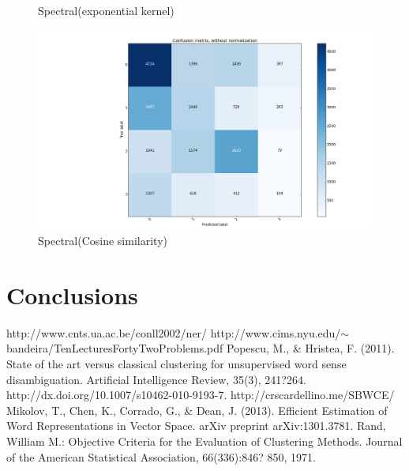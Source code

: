 \documentclass[]{article}
\begin{document}
\begin{figure}
\begin{minipage}[b]{0.5\linewidth}
    \caption{Spectral(exponential kernel)} 
    \vspace{4ex}
  \end{minipage}%
  \begin{minipage}[b]{0.5\linewidth}
    \centering
    \includegraphics[width=1\linewidth]{cosSimConfMat2.png} 
    \caption{Spectral(Cosine similarity)} 
    \vspace{4ex}
  \end{minipage} 
\end{figure}


\section{Conclusions}
  
\pagestyle{myheadings}
\thispagestyle{plain}


\begin{thebibliography}{1}
   http://www.cnts.ua.ac.be/conll2002/ner/
  http://www.cims.nyu.edu/$\sim$bandeira/TenLecturesFortyTwoProblems.pdf
   Popescu, M., \& Hristea, F. (2011). State of the art versus classical clustering for unsupervised word sense disambiguation. Artificial Intelligence Review, 35(3), 241?264. http://dx.doi.org/10.1007/s10462-010-9193-7.  
   http://crscardellino.me/SBWCE/
    Mikolov, T., Chen, K., Corrado, G., \& Dean, J. (2013). Efficient Estimation of Word Representations in Vector Space. arXiv preprint arXiv:1301.3781. 
   Rand, William M.: Objective Criteria for the Evaluation of Clustering Methods. Journal of the American Statistical Association, 66(336):846? 850, 1971.
\end{thebibliography} 
\end{document}
